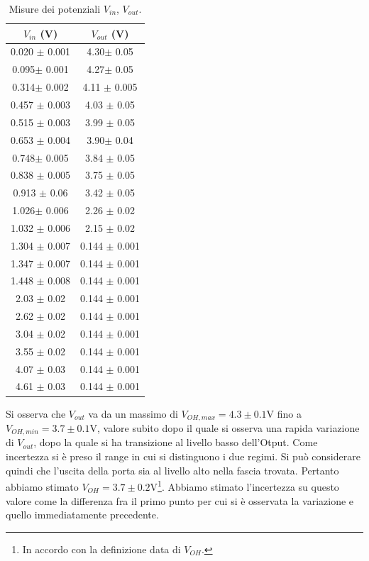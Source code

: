 \documentclass[10pt,a4paper]{article}
\begin{document}
\begin{table}
\centering
\begin{tabular}{|c|c|}
\hline
$V_{in}$ (V) & $V_{out}$ (V)\\
\hline
0.020 $\pm$ 0.001 & 4.30$\pm$ 0.05\\
0.095$\pm$ 0.001 & 4.27$\pm$ 0.05\\
0.314$\pm$ 0.002 & 4.11 $\pm$ 0.005\\
0.457 $\pm$ 0.003 & 4.03 $\pm$ 0.05\\
0.515 $\pm$ 0.003 & 3.99 $\pm$ 0.05\\
0.653 $\pm$ 0.004 & 3.90$\pm$ 0.04\\
0.748$\pm$ 0.005 & 3.84 $\pm$ 0.05\\
0.838 $\pm$ 0.005 & 3.75 $\pm$ 0.05\\
0.913 $\pm$ 0.06 & 3.42 $\pm$ 0.05\\
1.026$\pm$ 0.006 & 2.26 $\pm$ 0.02\\
1.032 $\pm$ 0.006 & 2.15 $\pm$ 0.02\\
1.304 $\pm$ 0.007 & 0.144 $\pm$ 0.001\\
1.347 $\pm$ 0.007 & 0.144 $\pm$ 0.001\\
1.448 $\pm$ 0.008 & 0.144 $\pm$ 0.001\\
2.03 $\pm$ 0.02 & 0.144 $\pm$ 0.001\\
2.62 $\pm$ 0.02& 0.144 $\pm$ 0.001\\
3.04 $\pm$ 0.02 & 0.144 $\pm$ 0.001\\
3.55 $\pm$ 0.02 & 0.144 $\pm$ 0.001\\
4.07 $\pm$ 0.03 & 0.144 $\pm$ 0.001\\
4.61 $\pm$ 0.03 & 0.144 $\pm$ 0.001\\
\hline
\end{tabular}
\caption{Misure dei potenziali $V_{in}$, $V_{out}$.\label{tab:vinvout}}
\end{table}
Si osserva che $V_{out}$ va da un massimo di $V_{OH,max}=4.3 \pm 0.1$V fino a 
$V_{OH,min}=3.7\pm 0.1$V, valore subito dopo il quale si osserva una rapida variazione di $V_{out}$, dopo la quale si ha transizione al livello basso dell'Otput. %
Come incertezza si è preso il range in cui si distinguono i due regimi.
Si può considerare quindi che l'uscita della porta sia al livello alto nella fascia trovata. Pertanto abbiamo stimato $V_{OH}=3.7\pm0.2$V\footnote{In accordo con la definizione data di $V_{OH}$.}. Abbiamo stimato l'incertezza su questo valore come la differenza fra il primo punto per cui si è osservata la variazione e quello immediatamente precedente.
\end{document}
